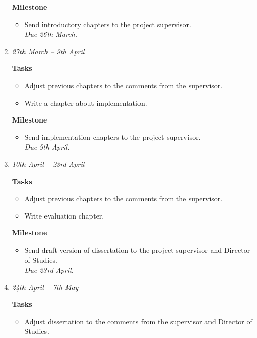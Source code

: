 \documentclass[a4paper,12pt]{article}
\begin{document}
\begin{enumerate}
\textbf{Milestone}
 \begin{itemize}
  \item Send introductory chapters to the project supervisor.\\
 \emph{ Due 26th March.}
 \end{itemize}




 \item 
 \emph{27th March -- 9th April}

\textbf{Tasks}
 \begin{itemize}
 \item Adjust previous chapters to the comments from the supervisor.
 \item  Write a chapter about implementation.
 \end{itemize}

\textbf{Milestone}
 \begin{itemize}
  \item Send implementation chapters to the project supervisor.\\
 \emph{ Due 9th April. }
 \end{itemize}
 




 \item 
 \emph{10th April -- 23rd April}

 \textbf{Tasks}
 \begin{itemize}
  \item 
  Adjust previous chapters to the comments from the supervisor.
 \item 
  Write evaluation chapter.
 \end{itemize}


\textbf{Milestone}
 \begin{itemize}
  \item Send draft version of dissertation to the project supervisor and Director of Studies.\\
 \emph{ Due 23rd April. }
 \end{itemize}



 
 \item 
 \emph{24th April -- 7th May}

 \textbf{Tasks}
 \begin{itemize}
  \item Adjust dissertation to the comments from the supervisor and Director of Studies.
 \end{itemize}


\end{enumerate}
\end{document}
